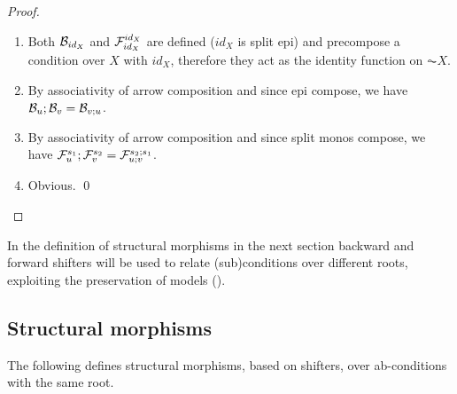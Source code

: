 \begin{fullorname}
\begin{proof}
\begin{enumerate}
\item Both $\mathcal{B}_{id_X}$ and $\mathcal{F}^{id_X}_{id_X}$ are defined ($id_X$ is split epi) and  precompose a condition over $X$ with $id_X$, therefore they act as the identity function on $\AC{X}$. 
\item By associativity of arrow composition and since epi compose, we have  $\mathcal{B}_u;\mathcal{B}_v = \mathcal{B}_{v;u}$.
\item By associativity of arrow composition and since split monos compose, we have $\mathcal{F}^{s_1}_u;\mathcal{F}^{s_2}_v = \mathcal{F}^{s_2;s_1}_{u;v}$.
\item Obvious. \qed
\end{enumerate}
\end{proof}
\end{fullorname}

In the definition of structural morphisms in the next section backward and forward shifters will be used to relate (sub)conditions over different roots, exploiting the preservation of models (). 




\subsection{Structural morphisms}

The following defines structural morphisms, based on shifters, over ab-conditions with the same root.
 
